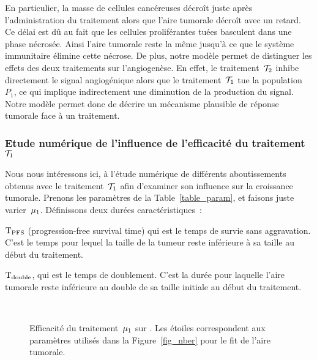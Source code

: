 \documentclass[main.tex]{subfiles}
\begin{document}
En particulier, la masse de cellules cancéreuses décroît juste après l'administration du traitement alors que l'aire tumorale décroît avec un retard. 
Ce délai est dû au fait que les cellules proliférantes tuées basculent dans une phase nécrosée. Ainsi l'aire tumorale reste la même jusqu'à ce que le système immunitaire élimine cette nécrose. 
De plus, notre modèle permet de distinguer les effets des deux traitements sur l'angiogenèse. 
En effet, le traitement~${\mathcal T_2}$ inhibe directement le signal angiogénique alors que le  traitement~${\mathcal T_1}$ tue la population~$P_1$, ce qui implique indirectement une diminution de la production du signal. 
Notre modèle permet donc de décrire un mécanisme plausible de réponse tumorale face à un traitement. 

\subsubsection{Etude numérique de l'influence de l'efficacité du traitement~${\mathcal T_1}$}\label{subsec:NumEff}
Nous nous intéressons ici, à l'étude numérique de différents aboutissements obtenus avec le 
traitement~${\mathcal T_1}$ afin d'examiner son influence sur la croissance tumorale. 
Prenons les paramètres de la Table~\ref{table_param}, et faisons juste varier~$\mu_1$. 
Définissons deux durées caractéristiques~:
\begin{myitemize}
\item ${\rm T_{PFS}}$ (progression-free survival time) qui est le temps de survie sans aggravation. C'est le temps pour lequel la taille de la tumeur reste inférieure à sa taille au début du traitement.  
\item ${\rm T_{double}}$, qui est le temps de doublement. C'est la durée pour laquelle l'aire tumorale reste inférieure au double de sa taille initiale au début du traitement. 
\end{myitemize}
\begin{figure}[!htb]
\centering
\captionsetup[subfigure]{margin=10pt}
\\
\caption{Efficacité du traitement~$\mu_1$ sur \Nber. Les étoiles correspondent aux paramètres utilisés dans la Figure~\ref{fig_nber} pour le fit de l'aire tumorale. \label{fig:eff_glivec_nber}}
\end{figure}
\end{document}
